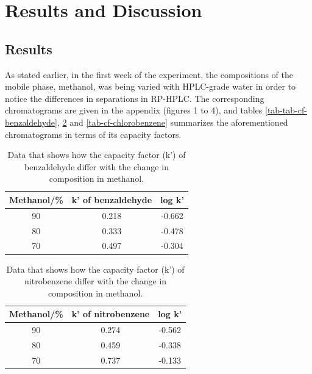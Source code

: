 \documentclass[a4paper, 12pt]{article}
\begin{document}

\section{Results and Discussion}

\subsection{Results}
As stated earlier, in the first week of the experiment, the compositions of the mobile phase, methanol, was being varied with HPLC-grade water in order to notice the differences in separations in RP-HPLC. The corresponding chromatograms are given in the appendix (figures 1 to 4), and tables \ref{tab-tab-cf-benzaldehyde}, \ref{tab-cf-nitrobenzene} and \ref{tab-cf-chlorobenzene} summarizes the aforementioned chromatograms in terms of its capacity factors.

\begin{table}[h!]
	\centering
	\caption{Data that shows how the capacity factor (k') of benzaldehyde differ with the change in composition in methanol.}
	\begin{tabular}{|c|c|c|}
		\hline
		Methanol/\% & k' of benzaldehyde & log k' \\
		\hline
		90 & 0.218 & -0.662 \\
		\hline
		80 & 0.333 & -0.478 \\
		\hline
		70 & 0.497 & -0.304 \\
		\hline
	\end{tabular}
	\label{tab-cf-benzaldehyde}
\end{table}

\begin{table}[h!]
	\centering
	\caption{Data that shows how the capacity factor (k') of nitrobenzene differ with the change in composition in methanol.}
	\begin{tabular}{|c|c|c|}
		\hline
		Methanol/\% & k' of nitrobenzene & log k' \\
		\hline
		90 & 0.274 & -0.562 \\
		\hline
		80 & 0.459 & -0.338 \\
		\hline
		70 & 0.737 & -0.133 \\
		\hline
	\end{tabular}
	\label{tab-cf-nitrobenzene}
\end{table}
\end{document}
